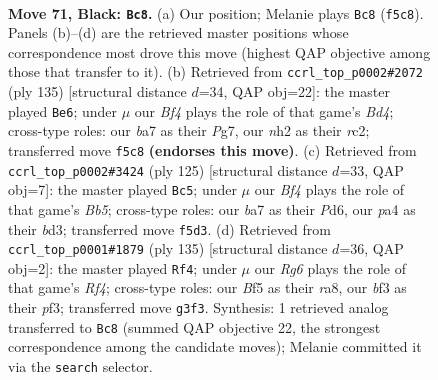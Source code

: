 \documentclass[11pt]{article}
\begin{document}
\clearpage

\begin{figure}[p]\centering
\begin{subfigure}{0.46\textwidth}\centering
\resizebox{\linewidth}{!}{%
\newchessgame
\chessboard[
  setfen={8/B4k2/8/1K3b2/PP6/5Brp/1R5N/8 b - - 0 71},
  showmover=false,
  pgfstyle=straightmove, color=movearrow, markmove={f5-c8}
]}
\caption{}
\end{subfigure}\hfill
\begin{subfigure}{0.46\textwidth}\centering
\resizebox{\linewidth}{!}{%
\newchessgame
\chessboard[
  setfen={8/6pk/8/3bprBP/7K/7P/2R2P2/8 b - - 17 68},
  showmover=false,
  pgfstyle=straightmove, color=movearrow, markmove={d5-e6}
]}
\caption{}
\end{subfigure}
\\[4pt]
\begin{subfigure}{0.46\textwidth}\centering
\resizebox{\linewidth}{!}{%
\newchessgame
\chessboard[
  setfen={8/8/3p4/6kp/1b6/3B3P/P4RK1/r7 b - - 2 63},
  showmover=false,
  pgfstyle=straightmove, color=movearrow, markmove={b4-c5}
]}
\caption{}
\end{subfigure}\hfill
\begin{subfigure}{0.46\textwidth}\centering
\resizebox{\linewidth}{!}{%
\newchessgame
\chessboard[
  setfen={R7/4k3/1b6/4pr2/P7/5P2/4B3/4K3 b - - 1 68},
  showmover=false,
  pgfstyle=straightmove, color=movearrow, markmove={f5-f4}
]}
\caption{}
\end{subfigure}
\caption{\textbf{Move 71, Black: \texttt{Bc8}.} (a) Our position; Melanie plays \texttt{Bc8} (\texttt{f5c8}). Panels (b)--(d) are the retrieved master positions whose correspondence most drove this move (highest QAP objective among those that transfer to it). (b) Retrieved from \texttt{ccrl\_top\_p0002\#2072} (ply 135) [structural distance $d$=34, QAP obj=22]: the master played \texttt{Be6}; under $\mu$ our \emph{Bf4} plays the role of that game's \emph{Bd4}; cross-type roles: our \emph{b}a7 as their \emph{P}g7, our \emph{n}h2 as their \emph{r}c2; transferred move \texttt{f5c8} \textbf{(endorses this move)}. (c) Retrieved from \texttt{ccrl\_top\_p0002\#3424} (ply 125) [structural distance $d$=33, QAP obj=7]: the master played \texttt{Bc5}; under $\mu$ our \emph{Bf4} plays the role of that game's \emph{Bb5}; cross-type roles: our \emph{b}a7 as their \emph{P}d6, our \emph{p}a4 as their \emph{b}d3; transferred move \texttt{f5d3}. (d) Retrieved from \texttt{ccrl\_top\_p0001\#1879} (ply 135) [structural distance $d$=36, QAP obj=2]: the master played \texttt{Rf4}; under $\mu$ our \emph{Rg6} plays the role of that game's \emph{Rf4}; cross-type roles: our \emph{B}f5 as their \emph{r}a8, our \emph{b}f3 as their \emph{p}f3; transferred move \texttt{g3f3}. Synthesis: 1 retrieved analog transferred to \texttt{Bc8} (summed QAP objective 22, the strongest correspondence among the candidate moves); Melanie committed it via the \texttt{search} selector.}
\label{fig:thought-m141}
\end{figure}
\end{document}

